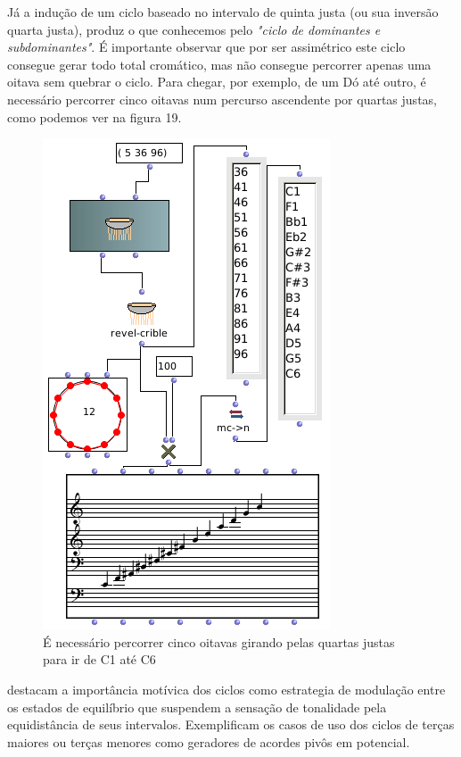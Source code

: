 \documentclass[
	12pt,				%
	openright,			%
	twoside,			%
	a4paper,			%
	english,			%
	french,				%
	spanish,			%
	brazil				%
	]{abntex2}
\begin{document}
Já a indução de um ciclo baseado no intervalo de quinta justa (ou sua inversão quarta justa), produz o que conhecemos pelo \textit{"ciclo de dominantes e subdominantes"}. É importante observar que por ser assimétrico este ciclo consegue gerar todo total cromático, mas não consegue percorrer apenas uma oitava sem quebrar o ciclo. Para chegar, por exemplo, de um Dó até outro, é necessário percorrer cinco oitavas num percurso ascendente por quartas justas, como podemos ver na figura 19.


\begin{figure}[!h]
	\caption{\label{fig_grafico}É necessário percorrer cinco oitavas girando pelas quartas justas para ir de C1 até C6  }
	\begin{center}
	    \includegraphics[scale=0.5]{ciclos/5JcrivosOM.png}
	\end{center}
\end{figure}

 destacam a importância motívica dos ciclos como estrategia de modulação entre os estados de equilíbrio que suspendem a sensação de tonalidade pela equidistância de seus intervalos. Exemplificam os casos de uso dos ciclos de terças maiores ou terças menores como geradores de acordes pivôs em potencial.
\end{document}
